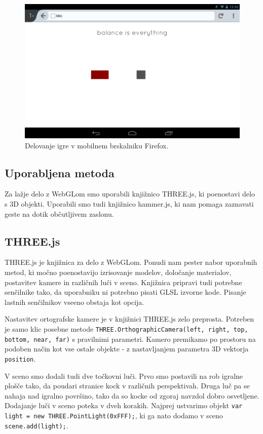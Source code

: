 \begin{figure}
\begin{center}
\includegraphics[width=12cm]{pic/min-ff.png}
\end{center}
\caption{Delovanje igre v mobilnem brskalniku Firefox.}
\label{minff}
\end{figure}

\subsection{Uporabljena metoda}

Za lažje delo z WebGLom smo uporabili knjižnico THREE.js, ki poenostavi delo s 3D objekti. Uporabili smo tudi knjižnico hammer.js, ki nam pomaga zaznavati geste na dotik občutljivem zaslonu.

\subsection*{THREE.js}

THREE.js je knjižnica za delo z WebGLom. Ponudi nam pester nabor uporabnih metod, ki močno poenostavijo izrisovanje modelov, določanje materialov, postavitev kamere in različnih luči v sceno. Knjižnica pripravi tudi potrebne senčilnike tako, da uporabniku ni potrebno pisati GLSL izvorne kode. Pisanje lastnih senčilnikov vseeno obstaja kot opcija.

Nastavitev ortografske kamere je v knjižnici THREE.js zelo preprosta. Potreben je samo klic posebne metode \texttt{THREE.OrthographicCamera(left, right, top, bottom, near, far)} s pravilnimi parametri. Kamero premikamo po prostoru na podoben način kot vse ostale objekte - z nastavljanjem parametra 3D vektorja \texttt{position}. 

V sceno smo dodali tudi dve točkovni luči. Prvo smo postavili na rob igralne plošče tako, da poudari stranice kock v različnih perspektivah. Druga luč pa se nahaja nad igralno površino, tako da so kocke od zgoraj navzdol dobro osvetljene. Dodajanje luči v sceno poteka v dveh korakih. Najprej ustvarimo objekt \texttt{var light =  new THREE.PointLight(0xFFF);}, ki ga nato dodamo v sceno \texttt{scene.add(light);}.

